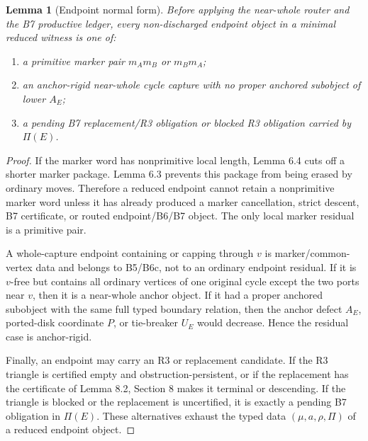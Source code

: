 \documentclass[11pt]{amsart}
\newtheorem{lemma}[theorem]{Lemma}
\theoremstyle{definition}
\begin{document}
\begin{lemma}[Endpoint normal form]
Before applying the near-whole router and the B7 productive ledger, every non-discharged endpoint object in a minimal reduced witness is one of:

\begin{enumerate}
\item a primitive marker pair \(m_A m_B\) or \(m_B m_A\);
\item an anchor-rigid near-whole cycle capture with no proper anchored subobject of lower \(A_E\);
\item a pending B7 replacement/R3 obligation or blocked R3 obligation carried by \(\Pi(E)\).
\end{enumerate}

\end{lemma}
\begin{proof}
If the marker word has nonprimitive local length, Lemma 6.4 cuts off a shorter marker package. Lemma 6.3 prevents this package from being erased by ordinary moves. Therefore a reduced endpoint cannot retain a nonprimitive marker word unless it has already produced a marker cancellation, strict descent, B7 certificate, or routed endpoint/B6/B7 object. The only local marker residual is a primitive pair.

A whole-capture endpoint containing or capping through \(v\) is marker/common-vertex data and belongs to B5/B6c, not to an ordinary endpoint residual. If it is \(v\)-free but contains all ordinary vertices of one original cycle except the two ports near \(v\), then it is a near-whole anchor object. If it had a proper anchored subobject with the same full typed boundary relation, then the anchor defect \(A_E\), ported-disk coordinate \(P\), or tie-breaker \(U_E\) would decrease. Hence the residual case is anchor-rigid.

Finally, an endpoint may carry an R3 or replacement candidate. If the R3 triangle is certified empty and obstruction-persistent, or if the replacement has the certificate of Lemma 8.2, Section 8 makes it terminal or descending. If the triangle is blocked or the replacement is uncertified, it is exactly a pending B7 obligation in \(\Pi(E)\). These alternatives exhaust the typed data \((\mu,a,\rho,\Pi)\) of a reduced endpoint object.

\end{proof}
\end{document}

